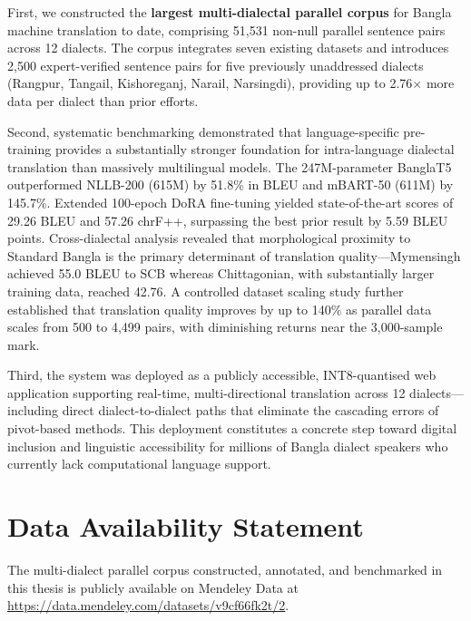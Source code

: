 \documentclass[12pt,a4paper]{article}
\begin{document}
First, we constructed the \textbf{largest multi-dialectal parallel corpus} for Bangla machine translation to date, comprising 51,531 non-null parallel sentence pairs across 12 dialects. The corpus integrates seven existing datasets and introduces 2,500 expert-verified sentence pairs for five previously unaddressed dialects (Rangpur, Tangail, Kishoreganj, Narail, Narsingdi), providing up to 2.76$\times$ more data per dialect than prior efforts.

Second, systematic benchmarking demonstrated that language-specific pre-training provides a substantially stronger foundation for intra-language dialectal translation than massively multilingual models. The 247M-parameter BanglaT5 outperformed NLLB-200 (615M) by 51.8\% in BLEU and mBART-50 (611M) by 145.7\%. Extended 100-epoch DoRA fine-tuning yielded state-of-the-art scores of 29.26 BLEU and 57.26 chrF++, surpassing the best prior result \cite{mahjabin2025banglachq} by 5.59 BLEU points. Cross-dialectal analysis revealed that morphological proximity to Standard Bangla is the primary determinant of translation quality---Mymensingh achieved 55.0 BLEU to SCB whereas Chittagonian, with substantially larger training data, reached 42.76. A controlled dataset scaling study further established that translation quality improves by up to 140\% as parallel data scales from 500 to 4,499 pairs, with diminishing returns near the 3,000-sample mark.

Third, the system was deployed as a publicly accessible, INT8-quantised web application supporting real-time, multi-directional translation across 12 dialects---including direct dialect-to-dialect paths that eliminate the cascading errors of pivot-based methods. This deployment constitutes a concrete step toward digital inclusion and linguistic accessibility for millions of Bangla dialect speakers who currently lack computational language support.

\section*{Data Availability Statement}
The multi-dialect parallel corpus constructed, annotated, and benchmarked in this thesis is publicly available on Mendeley Data at \url{https://data.mendeley.com/datasets/v9cf66fk2t/2}.
\end{document}
